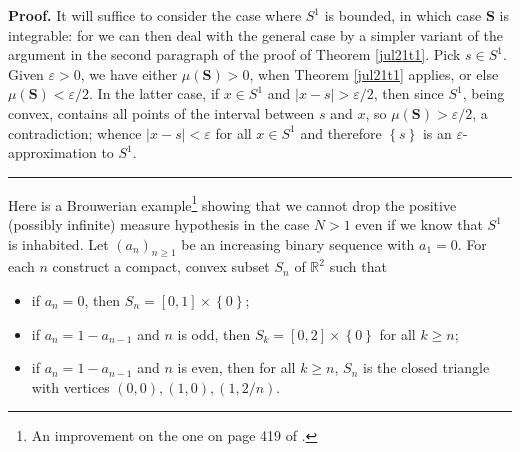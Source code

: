 \documentclass[11pt]{article}%
\newenvironment{proof}[1][Proof]{\noindent\textbf{#1.} }{\ \rule{0.5em}{0.5em}}
\begin{document}
\begin{proof}
It will suffice to consider the case where $S^{1}$ is bounded, in which case
$\mathbf{S}$ is integrable: for we can then deal with the general case by a
simpler variant of the argument in the second paragraph of the proof of
Theorem \ref{jul21t1}. Pick $s\in S^{1}$. Given $\varepsilon>0$, we have
either $\mu(\mathbf{S})>0$, when Theorem \ref{jul21t1} applies, or else
$\mu(\mathbf{S})<\varepsilon/2$. In the latter case, if $x\in S^{1}$ and
$\left\vert x-s\right\vert >\varepsilon/2$, then since $S^{1}$, being convex,
contains all points of the interval between $s$ and $x$, so $\mu
(\mathbf{S})>\varepsilon/2$, a contradiction; whence $\left\vert
x-s\right\vert <\varepsilon$ for all $x\in S^{1}$ and therefore $\left\{
s\right\}  $ is an $\varepsilon$-approximation to $S^{1}$.
\end{proof}

%

\medskip


Here is a Brouwerian example\footnote{%
\normalfont\sf
An improvement on the one on page 419 of \cite{Br88}.} showing that we cannot
drop the positive (possibly infinite) measure hypothesis in the case $N>1$
even if we know that $S^{1}$ is inhabited. Let $\left(  a_{n}\right)
_{n\geqslant1}$ be an increasing binary sequence with $a_{1}=0$. For each $n$
construct a compact, convex subset $S_{n}$ of $\mathbb{R}^{2}$ such that

\begin{itemize}
\item[--] if $a_{n}=0$, then $S_{n}=\left[  0,1\right]  \times\left\{
0\right\}  $;

\item[--] if $a_{n}=1-a_{n-1}$ and $n$ is odd, then $S_{k}=\left[  0,2\right]
\times\left\{  0\right\}  $ for all $k\geqslant n$;

\item[--] if $a_{n}=1-a_{n-1}$ and $n$ is even, then for all $k\geqslant n$,
$S_{n}$ is the closed triangle with vertices $\left(  0,0\right)  ,\left(
1,0\right)  ,\left(  1,2/n\right)  $.
\end{itemize}

%
\end{document}
